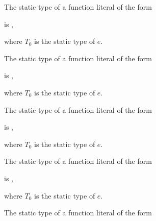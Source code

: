 \documentclass[makeidx]{article}
\begin{document}
\LMHash{}%
The static type of a function literal of the form

\noindent
\code{<\TypeParametersStd>}

\noindent
{}

\noindent
is
,

\noindent
where $T_0$ is the static type of $e$.

\LMHash{}%
The static type of a function literal of the form

\noindent
\code{<\TypeParametersStd>}

\noindent
{}

\noindent
is
,

\noindent
where $T_0$ is the static type of $e$.

\LMHash{}%
The static type of a function literal of the form

\noindent
\code{<\TypeParametersStd>}

\noindent
{}

\noindent
is
,

\noindent
where $T_0$ is the static type of $e$.

\LMHash{}%
The static type of a function literal of the form

\noindent
\code{<\TypeParametersStd>}

\noindent
{}

\noindent
is
,

\noindent
where $T_0$ is the static type of $e$.

\LMHash{}%
The static type of a function literal of the form

\noindent
{}

\noindent
{}
\end{document}
